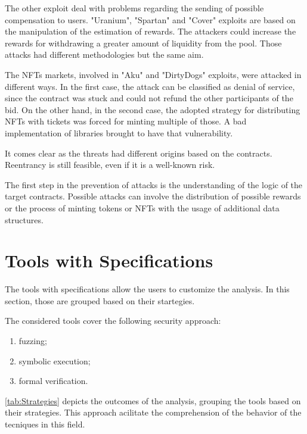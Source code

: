 The other exploit deal with problems regarding the sending of possible compensation to users. 
"Uranium", "Spartan" and "Cover" exploits are based on the manipulation of the estimation of rewards. 
The attackers could increase the rewards for withdrawing a greater amount of liquidity from the pool. Those attacks had different methodologies but the same aim. 

The NFTs markets, involved in "Aku" and "DirtyDogs" exploits, were attacked in different ways. 
In the first case, the attack can be classified as denial of service, since the contract was stuck and could not refund the other participants of the bid.
On the other hand, in the second case, the adopted strategy for distributing NFTs with tickets was forced for minting multiple of those. A bad implementation of libraries brought to have that vulnerability. 

It comes clear as the threats had different origins based on the contracts.
Reentrancy is still feasible, even if it is a well-known risk.

The first step in the prevention of attacks is the understanding of the logic of the target contracts. 
Possible attacks can involve the distribution of possible rewards or the process of minting tokens or NFTs with the usage of additional data structures. 



\section{Tools with Specifications}
The tools with specifications allow the users to customize the analysis. 
In this section, those are grouped based on their startegies. 

The considered tools cover the following security approach:
\begin{enumerate}
    \item fuzzing;
    \item symbolic execution;
    \item formal verification. 
\end{enumerate} 

\autoref{tab:Strategies} depicts the outcomes of the analysis, grouping the tools based on their strategies. 
This approach acilitate the comprehension of the behavior of the tecniques in this field.

